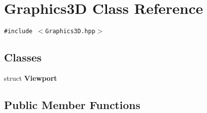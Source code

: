\hypertarget{classm3g_1_1Graphics3D}{
\section{Graphics3D Class Reference}
\label{classm3g_1_1Graphics3D}
}
{\tt \#include $<$Graphics3D.hpp$>$}

\subsection*{Classes}
\begin{CompactItemize}
\item 
struct \textbf{Viewport}
\end{CompactItemize}
\subsection*{Public Member Functions}
